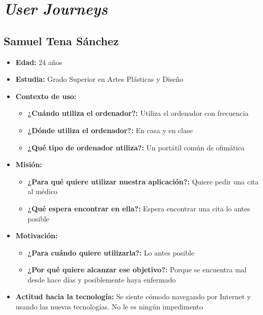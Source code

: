 \section{\textit{User Journeys}}\label{anexo}

\subsection{Samuel Tena Sánchez}
\begin{itemize}
    \item \textbf{Edad: } 24 años
    \item \textbf{Estudia: } Grado Superior en Artes Plásticas y Diseño
    \item \textbf{Contexto de uso: } 
    \begin{itemize}
        \item \textbf{¿Cuándo utiliza el ordenador?: }  Utiliza el ordenador con frecuencia
        \item \textbf{¿Dónde utiliza el ordenador?: } En casa y en clase 
        \item \textbf{¿Qué tipo de ordenador utiliza?: } Un portátil común de ofimática
    \end{itemize}
    \item \textbf{Misión: } 
    \begin{itemize}
        \item \textbf{¿Para qué quiere utilizar nuestra aplicación?: } Quiere pedir una cita al médico
        \item \textbf{¿Qué espera encontrar en ella?: } Espera encontrar una cita lo antes posible 
    \end{itemize}
    \item \textbf{Motivación: } 
    \begin{itemize}
        \item \textbf{¿Para cuándo quiere utilizarla?: } Lo antes posible
        \item \textbf{¿Por qué quiere alcanzar ese objetivo?: } Porque se encuentra mal desde hace días y posiblemente haya enfermado
    \end{itemize}
    \item \textbf{Actitud hacia la tecnología: } Se siente cómodo navegando por Internet y usando las nuevas tecnologías. No le es ningún impedimento
\end{itemize}

